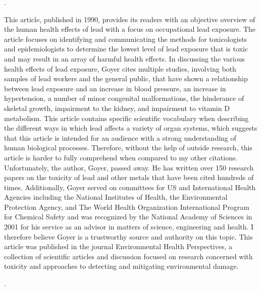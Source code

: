 \documentclass{article}
\begin{document}
\bigskip

. 

\bigskip

This article, published in 1990, provides its readers with an objective overview of the human health effects of lead with a focus on occupational lead exposure. The article focuses on identifying and communicating the methods for toxicologists and epidemiologists to determine the lowest level of lead exposure that is toxic and may result in an array of harmful health effects. In discussing the various health effects of lead exposure, Goyer cites multiple studies, involving both samples of lead workers and the general public, that have shown a relationship between lead exposure and an increase in blood pressure, an increase in hypertension, a number of minor congenital malformations, the hinderance of skeletal growth, impairment to the kidney, and impairment to vitamin D metabolism. This article contains specific scientific vocabulary when describing the different ways in which lead affects a variety of organ systems, which suggests that this article is intended for an audience with a strong understanding of human biological processes. Therefore, without the help of outside research, this article is harder to fully comprehend when compared to my other citations. Unfortunately, the author, Goyer, passed away. He has written over 150 research papers on the toxicity of lead and other metals that have been cited hundreds of times. Additionally, Goyer served on committees for US and International Health Agencies including the National Institutes of Health, the Environmental Protection Agency, and The World Health Organization International Program for Chemical Safety and was recognized by the National Academy of Sciences in 2001 for his service as an advisor in matters of science, engineering and health. I therefore believe Goyer is a trustworthy source and authority on this topic. This article was published in the journal Environmental Health Perspectives, a collection of scientific articles and discussion focused on research concerned with toxicity and approaches to detecting and mitigating environmental damage. 

\bigskip


. 
\end{document}

